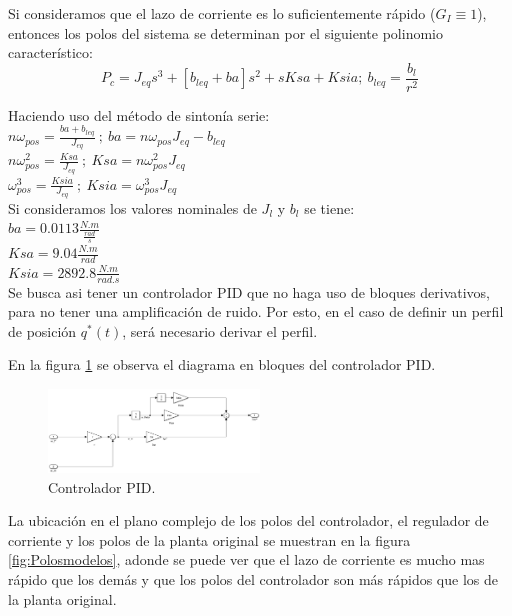 \documentclass[10pt]{article}
\begin{document}
	Si consideramos que el lazo de corriente es lo suficientemente rápido ($G_{I}\equiv 1$), entonces los polos del sistema se determinan por el siguiente polinomio característico:
	\begin{equation}
	P_{c}=J_{eq}s^{3}+[b_{leq}+ba]s^{2}+sKsa+Ksia; \ b_{leq}= \frac{b_{l}}{r^{2}} 
	\label{eq:2.1.2.q.7}
	\end{equation}
	
	Haciendo uso del método de sintonía serie:\\
	$ n\omega_{pos}=\frac{ba+b_{leq}}{J_{eq}} \ ; \ ba=n\omega_{pos}J_{eq}-b_{leq}$ \\
	$ n\omega^{2}_{pos}=\frac{Ksa}{J_{eq}} \ ; \  Ksa=n\omega^{2}_{pos}J_{eq} $\\
	$ \omega^{3}_{pos}=\frac{Ksia}{J_{eq}} \ ; \  Ksia=\omega^{3}_{pos}J_{eq} $\\
	
	Si consideramos los valores nominales de $J_{l}$ y $b_{l}$ se tiene:\\
	$ba=0.0113 \frac{N.m}{\frac{rad}{s}}$\\
	$Ksa=9.04 \frac{N.m}{rad}$\\
	$Ksia=2892.8 \frac{N.m}{rad.s}$\\
	
	Se busca asi tener un controlador PID que no haga uso de bloques derivativos, para no tener una amplificación de ruido. Por esto, en el caso de definir un perfil de posición $q^{*}(t)$, será necesario derivar el perfil.
	
	En la figura \ref{fig:controladorPID} se observa el diagrama en bloques del controlador PID.
		 	\begin{figure}[h!]
	\centering
	\includegraphics[width=0.5\textwidth]{controladorPID.png}
	\caption{\label{fig:controladorPID}Controlador PID.}
	\end{figure}
	\newpage
	La ubicación en el plano complejo de los polos del controlador, el regulador de corriente y los polos de la planta original se muestran en la figura \ref{fig:Polosmodelos}, adonde se puede ver que el lazo de corriente es mucho mas rápido que los demás y que los polos del controlador son más rápidos que los de la planta original.
	
\end{document}
